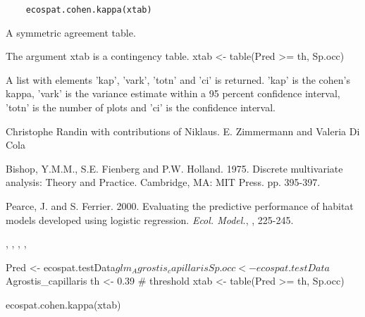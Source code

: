 \documentclass[a4paper]{book}
\begin{document}
%
\begin{Usage}
\begin{verbatim}
    ecospat.cohen.kappa(xtab)
\end{verbatim}
\end{Usage}
%
\begin{Arguments}
\begin{ldescription}
\item[\code{xtab}] 
A symmetric agreement table.


\end{ldescription}
\end{Arguments}
%
\begin{Details}\relax
The argument xtab is a contingency table.
xtab <- table(Pred >= th, Sp.occ)
\end{Details}
%
\begin{Value}
A list with elements 'kap', 'vark', 'totn' and 'ci' is returned. 
'kap' is the cohen's kappa, 'vark' is the variance estimate within a 95 percent confidence interval, 'totn' is the number of plots and 'ci' is the confidence interval. 
\end{Value}
%
\begin{Author}\relax
Christophe Randin  with contributions of Niklaus. E. Zimmermann  and Valeria Di Cola 
\end{Author}
%
\begin{References}\relax
Bishop, Y.M.M., S.E. Fienberg and P.W. Holland. 1975. Discrete multivariate analysis: Theory and Practice. Cambridge, MA: MIT Press. pp. 395-397.

Pearce, J. and S. Ferrier. 2000. Evaluating the predictive performance of habitat models developed using logistic regression. \emph{Ecol. Model.}, , 225-245.
\end{References}
%
\begin{SeeAlso}\relax
{}, , , , 
\end{SeeAlso}
%
\begin{Examples}
\begin{ExampleCode}
Pred <- ecospat.testData$glm_Agrostis_capillaris
Sp.occ <- ecospat.testData$Agrostis_capillaris
th <- 0.39 # threshold
xtab <- table(Pred >= th, Sp.occ)

ecospat.cohen.kappa(xtab)
\end{ExampleCode}
\end{Examples}
\end{document}
